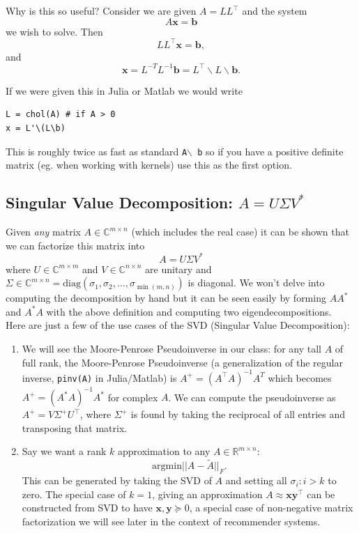 \documentclass{article}
\newcommand{\1}{\mathbf{1}}
\newcommand{\0}{\mathbf{0}}
\newcommand{\xx}{\mathbf{x}}
\newcommand{\yy}{\mathbf{y}}
\newcommand{\bb}{\mathbf{b}}
\newcommand{\RR}{\mathbb{R}}
\newcommand{\CC}{\mathbb{C}}
\newcommand{\T}{\top}
\newcommand{\argmin}{\mathrm{argmin}}
\begin{document}
Why is this so useful? Consider we are given $A=LL^\T$ and the system
\[
    A\xx = \bb
\]
we wish to solve. Then
\[
    LL^\T\xx = \bb,
\]
and
\[
    \xx = L^{-T}L^{-1}\bb = L^\T\backslash L \backslash \bb.
\]

If we were given this in Julia or Matlab we would write
{
\par
\ttfamily\small
\begin{verbatim}
L = chol(A) # if A > 0
x = L'\(L\b)
\end{verbatim}
\par
}
This is roughly twice as fast as standard \texttt{A$\backslash$ b}
so if you have a positive definite matrix (eg. when working with
kernels) use this as the first option.

\subsection{Singular Value Decomposition: $A = U\Sigma V^*$}

Given \textit{any} matrix $A\in\CC^{m\times n}$ (which includes the real
case) it can be shown that we can factorize this matrix into
\[
    A = U\Sigma V^*
\]
where $U\in\CC^{m\times m}$ and $V\in\CC^{n\times n}$ are unitary and
$\Sigma\in\CC^{m\times n} = \mathrm{diag}(\sigma_1, \sigma_2,\dots,
\sigma_{\min(m,n)})$ is diagonal. We won't delve into computing the
decomposition by hand but it can be seen easily by forming $AA^*$ and
$A^*A$ with the above definition and computing two eigendecompositions.\\

Here are just a few of the use cases of the SVD (Singular Value Decomposition):
\begin{enumerate}
\item We will see the Moore-Penrose Pseudoinverse in our class: for any
    tall $A$ of full rank, the Moore-Penrose Pseudoinverse (a generalization
    of the regular inverse, \texttt{pinv(A)} in Julia/Matlab) is
    $A^+ = (A^\T A)^{-1}A^T$ which becomes $A^+ = (A^*A)^{-1}A^*$ for complex
    $A$. We can compute the pseudoinverse as $A^+ = V\Sigma^+ U^\T$, where
    $\Sigma^+$ is found by taking the reciprocal of all entries and transposing
    that matrix.
\item Say we want a rank $k$ approximation to any $A\in\RR^{m\times n}$:
    \[
        \argmin || A - \tilde A ||_F.
    \]
    This can be generated by taking the SVD of $A$ and setting all
    $\sigma_i : i > k$ to zero. The special case of $k=1$, giving an
    approximation $A \approx \xx\yy^\T$ can be constructed from SVD
    to have $\xx,\yy \succeq 0$, a special case of non-negative matrix
    factorization we will see later in the context of recommender systems.
\end{enumerate}
\end{document}
